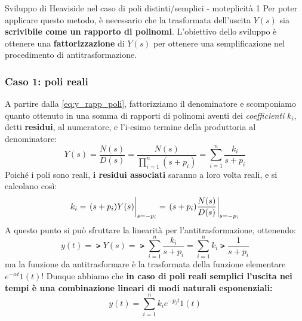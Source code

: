 \begin{defin}{Sviluppo di Heaviside nel caso di poli distinti/semplici - moteplicità 1}{}
Per poter applicare questo metodo, è necessario che la trasformata dell'uscita $Y(s)$ sia \textbf{scrivibile come un rapporto di polinomi}. L'obiettivo dello sviluppo è ottenere una \textbf{fattorizzazione} di $Y(s)$ per ottenere una semplificazione  nel procedimento di antitrasformazione. 

\subsubsection{Caso 1: poli reali}
A partire dalla \eqref{eq:y_rapp_poli}, fattorizziamo il denominatore e scomponiamo quanto ottenuto in una somma di rapporti di polinomi aventi dei \textit{coefficienti} $k_i$, detti \textbf{residui}, al numeratore, e l'i-esimo termine della produttoria al denominatore:
\begin{equation}
\label{eq:heavi_prima}
Y(s) = \frac{N(s)}{D(s)} = \frac{N(s)}{\prod_{i=1}^n (s+p_i)} = \sum_{i=1}^n \frac{k_i}{s+p_i}
\end{equation}
Poiché i poli sono reali, \textbf{i residui associati} saranno a loro volta reali, e si calcolano così:
\begin{equation}
k_i = \eval{(s+p_i)Y(s)}_{s=-p_i} = \eval{(s+p_i)\frac{N(s)}{D(s)}}_{s=-p_i}
\end{equation}
\begin{equation*}
\end{equation*} 
A questo punto si può sfruttare la linearità per l'antitrasformazione, ottenendo:
\begin{equation*}
y(t) = \lat{Y(s)} = \lat{\sum_{i=1}^n \frac{k_i}{s+p_i}} = \sum_{i=1}^n k_i \lat{\frac{1}{s+p_i}}
\end{equation*} 
ma la funzione da antitrasformare è la trasformata della funzione elementare $e^{-\alpha t}1(t)$! Dunque abbiamo che \textbf{in caso di poli reali semplici l'uscita nei tempi è una combinazione lineari di modi naturali esponenziali:}
\begin{equation}
\boxed{y(t) = \sum_{i=1}^n k_i e^{-p_i t}1(t)}
\end{equation}

\end{defin}
